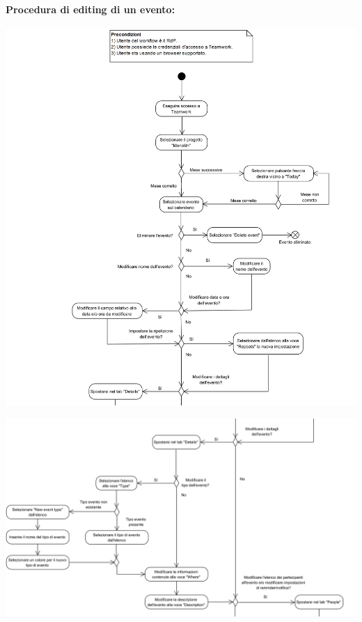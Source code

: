 \newpage
\paragraph{Procedura di editing di un evento:}

\begin{center}
	\includegraphics[width=15cm]{../../documenti/NormeDiProgetto/DiagrammiProcedure/EditEventi1.png}
\end{center}

\begin{center}
	\includegraphics[width=15cm]{../../documenti/NormeDiProgetto/DiagrammiProcedure/EditEventi2.png}
\end{center}

